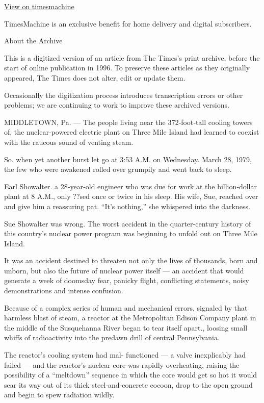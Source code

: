 \href{http://timesmachine.nytimes.com/timesmachine/1979/04/16/112104648.html}{View
on timesmachine}

TimesMachine is an exclusive benefit for home delivery and digital
subscribers.

About the Archive

This is a digitized version of an article from The Times's print
archive, before the start of online publication in 1996. To preserve
these articles as they originally appeared, The Times does not alter,
edit or update them.

Occasionally the digitization process introduces transcription errors or
other problems; we are continuing to work to improve these archived
versions.

MIDDLETOWN, Pa. --- The people living near the 372‐foot‐tall cooling
towers of, the nuclear‐powered electric plant on Three Mile Island had
learned to coexist with the raucous sound of venting steam.

So. when yet another burst let go at 3:53 A.M. on Wednesday. March 28,
1979, the few who were awakened rolled over grumpily and went back to
sleep.

Earl Showalter. a 28‐year‐old engineer who was due for work at the
billion‐dollar plant at 8 A.M., only ??sed once or twice in his sleep.
His wife, Sue, reached over and give him a reassuring pat. ``It's
nothing,'' she whispered into the darkness.

Sue Showalter was wrong. The worst accident in the quarter‐century
history of this country's nuclear power program was beginning to unfold
out on Three Mile Island.

It was an accident destined to threaten not only the lives of thousands,
born and unborn, but also the future of nuclear power itself --- an
accident that would generate a week of doomsday fear, panicky flight,
conflicting statements, noisy demonstrations and intense confusion.

Because of a complex series of human and mechanical errors, signaled by
that harmless blast of steam, a reactor at the Metropolitan Edison
Company plant in the middle of the Susquehanna River began to tear
itself apart., loosing small whiffs of radioactivity into the predawn
drill of central Pennsylvania.

The reactor's cooling system had mal- functioned --- a valve
inexplicably had failed --- and the reactor's nuclear core was rapidly
overheating, raising the possibility of a ``meltdown'' sequence in which
the core would get so hot it would sear its way out of its thick
steel‐and‐concrete cocoon, drop to the open ground and begin to spew
radiation wildly.


